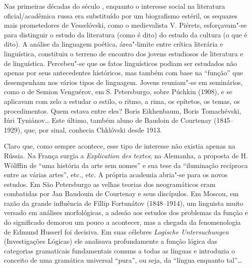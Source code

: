 Nas primeiras décadas do século , enquanto o interesse social na
literatura oficial/acadêmica russa era substituído por um biografismo
estéril, os sequazes mais prometedores de Vesselóvski, como o
medievalista V. Piérets, esforçavam"-se para distinguir o estudo da
literatura (como é dito) do estudo da cultura (o que é dito). A análise
da linguagem poética, área"-limite entre crítica literária e linguística,
constituiu o terreno de encontro dos jovens estudiosos de
literatura e de linguística. Percebeu"-se que os fatos linguísticos
podiam ser estudados não apenas por seus antecedentes históricos, mas
também com base na ``função'' que desempenham nos vários tipos de
linguagem. Jovens reuniam"-se em seminários,
como o de Semion Venguérov, em S. Petersburgo, sobre
Púchkin (1908), e se aplicavam com zelo a estudar o estilo, o ritmo, a
rima, os epítetos, os temas, os procedimentos. Quem estava entre eles?
Boris Eikhenbaum, Boris Tomachévski, Iúri Tyniánov\ldots{} Este último, também aluno de Baudoin de Courtenay (1845--1929), que, por sinal, conhecia Chklóvski desde 1913.

Claro que, como sempre acontece, esse tipo de interesse não existia
apenas na Rússia. Na França surgia a \emph{Explication des textes};
na Alemanha, a proposta de H. Wölfflin de ``uma história da arte sem
nomes'' e sua tese da ``iluminação recíproca entre as várias artes'',
etc., etc. A própria academia abria"-se para os novos estudos. Em São
Petersburgo as velhas teorias dos neogramáticos eram combatidas por Jan
Baudouin de Courtenay e seus discípulos. Em Moscou, em razão da grande
influência de Fíllip Fortunátov (1848--1914), um linguista muito versado em análises
morfológicas, a adesão aos estudos dos problemas da função e do
significado demorou um pouco a acontecer, mas a chegada da
fenomenologia de Edmund Husserl foi decisiva. Em suas célebres
\emph{Logische Untersuchungen} (Investigações Lógicas) ele analisava profundamente a
função lógica das categorias gramaticais fundamentais comuns a todas as
línguas e introduzia o conceito de uma gramática universal ``pura'', ou
seja, da ``língua enquanto tal''\ldots{}

